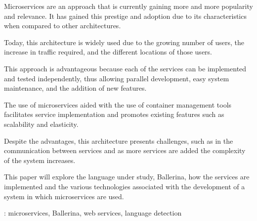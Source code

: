 \begin{secondlangabstract}

Microservices are an approach that is currently gaining more and more popularity and relevance. It has gained this prestige and adoption due to its characteristics when compared to other architectures.

Today, this architecture is widely used due to the growing number of users, the increase in traffic required, and the different locations of those users.

This approach is advantageous because each of the services can be implemented and tested independently, thus allowing parallel development, easy system maintenance, and the addition of new features.

The use of microservices aided with the use of container management tools facilitates service implementation and promotes existing features such as scalability and elasticity.

Despite the advantages, this architecture presents challenges, such as in the communication between services and as more services are added the complexity of the system increases.

This paper will explore the language under study, Ballerina, how the services are implemented and the various technologies associated with the development of a system in which microservices are used. 



\vspace*{10mm} 
\noindent
\textbf{\keywordslabel}: microservices, Ballerina, web services, language detection

\end{secondlangabstract}

